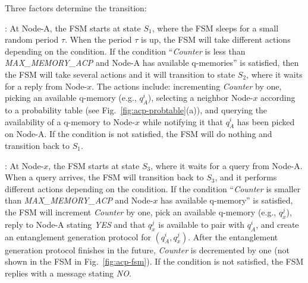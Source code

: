  Three factors determine the transition:


: At Node-A, the FSM starts at state $S_1$, where the FSM sleeps for a small random period $\tau$.
When the period $\tau$ is up, the FSM will take different actions depending on the condition.
If the condition ``\emph{Counter} is less than \emph{MAX\_MEMORY\_ACP} and Node-A has available q-memories'' is satisfied, then the FSM will take several actions and it will transition to state $S_2$, where it waits for a reply from Node-$x$.
The actions include: incrementing \emph{Counter} by one, picking an available q-memory (e.g., $q_A^i$), selecting a neighbor Node-$x$ according to a probability table (see Fig.~\ref{fig:acp-probtable}(a)), and querying the availability of a q-memory to Node-$x$ while notifying it that $q_A^i$ has been picked on Node-A.
If the condition is not satisfied, the FSM will do nothing and transition back to $S_1$.

: At Node-$x$, the FSM starts at state $S_3$, where it waits for a query from Node-A. 
When a query arrives, the FSM will transition back to $S_3$, and it performs different actions depending on the condition. 
If the condition ``\emph{Counter} is smaller than \emph{MAX\_MEMORY\_ACP} and Node-$x$ has available q-memory'' is satisfied, the FSM will increment \emph{Counter} by one, pick an available q-memory (e.g., $q_x^j$), reply to Node-A stating \emph{YES} and that $q_x^j$ is available to pair with $q_A^i$, and create an entanglement generation protocol for $(q_A^i, q_x^j)$.
After the entanglement generation protocol finishes in the future, \emph{Counter} is decremented by one (not shown in the FSM in Fig.~\ref{fig:acp-fsm}).
If the condition is not satisfied, the FSM replies with a message stating \emph{NO}.

